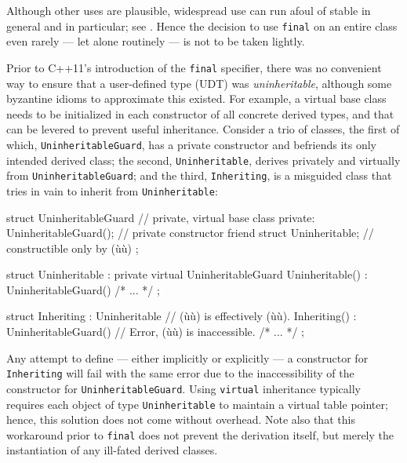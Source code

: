 {{Although other uses are plausible, widespread use can run afoul of
stable  in general and  in
particular; see . Hence the decision
to use \lstinline!final! on an entire class even rarely --- let alone
routinely --- is not to be taken lightly.

Prior to C++11's introduction of the \lstinline!final! specifier, there was
no convenient way to ensure that a user-defined type (UDT) was
\emph{uninheritable}, although some byzantine idioms to approximate this
existed. For example, a virtual base class needs to be initialized in
each constructor of all concrete derived types, and that can be levered
to prevent useful inheritance. Consider a trio of classes, the first of
which, \lstinline!UninheritableGuard!, has a private constructor and
befriends its only intended derived class; the second,
\lstinline!Uninheritable!, derives privately and virtually from
\lstinline!UninheritableGuard!; and the third, \lstinline!Inheriting!, is a
misguided class that tries in vain to inherit from
\lstinline!Uninheritable!:

\begin{emcppslisting}
struct UninheritableGuard  // private, virtual base class
{
private:
    UninheritableGuard();         // private constructor
    friend struct Uninheritable;  // constructible only by (ù{}ù)
};

struct Uninheritable : private virtual UninheritableGuard
{
    Uninheritable() : UninheritableGuard() { /* ... */ }
};

struct Inheriting : Uninheritable  // (ù{}ù) is effectively (ù{}ù).
{
    Inheriting()
    : UninheritableGuard()  // Error, (ù{}ù) is inaccessible.
    { /* ... */ }
};
\end{emcppslisting}
    

\noindent Any attempt to define --- either implicitly or explicitly --- a
constructor for \lstinline!Inheriting! will fail with the same error due to
the inaccessibility of the constructor for \lstinline!UninheritableGuard!.
Using \lstinline!virtual! inheritance typically requires each object of
type \lstinline!Uninheritable! to maintain a virtual table pointer; hence,
this solution does not come without overhead. Note also that this
workaround prior to \lstinline!final! does not prevent the derivation
itself, but merely the instantiation of any ill-fated derived classes.

}}
